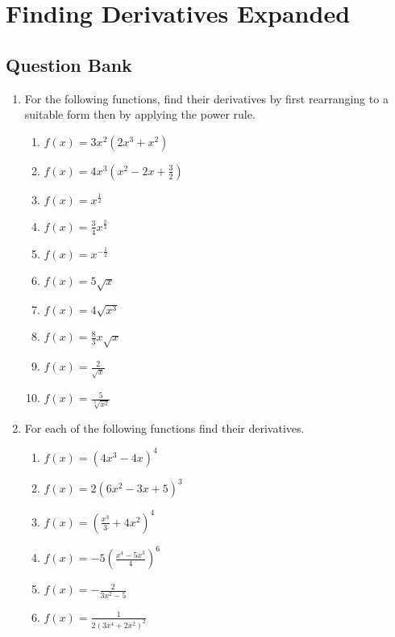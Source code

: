 \documentclass[a4paper,12pt]{article}
\begin{document}
\section*{Finding Derivatives Expanded}

\subsection*{Question Bank}

\begin{enumerate}
\item For the following functions, find their derivatives by first 
rearranging to a suitable form then by applying the power rule.
    \begin{multicols}{2}
    \begin{enumerate}
    \item \spacer$f(x) = 3x^2(2x^3 + x^2)$
    \item \spacer$f(x) = 4x^3\left(x^2 - 2x + \frac{3}{2}\right)$
    \item \spacer$f(x) = x^{\frac{1}{2}}$
    \item \spacer$f(x) = \frac{3}{4}x^{\frac{2}{3}}$
    \item \spacer$f(x) = x^{-\frac{1}{2}}$
    \item \spacer$f(x) = 5\sqrt{x}$
    \item \spacer$f(x) = 4\sqrt{x^3}$
    \item \spacer$f(x) = \frac{8}{3}x\sqrt{x}$
    \item \spacer$f(x) = \frac{2}{\sqrt{x}}$
    \item \spacer$f(x) = \frac{5}{\sqrt[3]{x^2}}$
    \end{enumerate}
    \end{multicols}

\item For each of the following functions find their derivatives.
    \begin{multicols}{2}
    \begin{enumerate}
    \item \spacer$f(x) = (4x^3 - 4x)^4$
    \item \spacer$f(x) = 2(6x^2 - 3x + 5)^3$
    \item \spacer$f(x) = \left(\frac{x^3}{3} + 4x^2\right)^4$
    \item \spacer$f(x) = -5\left(\frac{x^4 - 5x^3}{4}\right)^6$
    \item \spacer$f(x) = -\frac{2}{3x^2 - 5}$
    \item \spacer$f(x) = \frac{1}{2(3x^4 + 2x^2)^2}$
    \end{enumerate}
    \end{multicols}


\end{enumerate}
\end{document}
